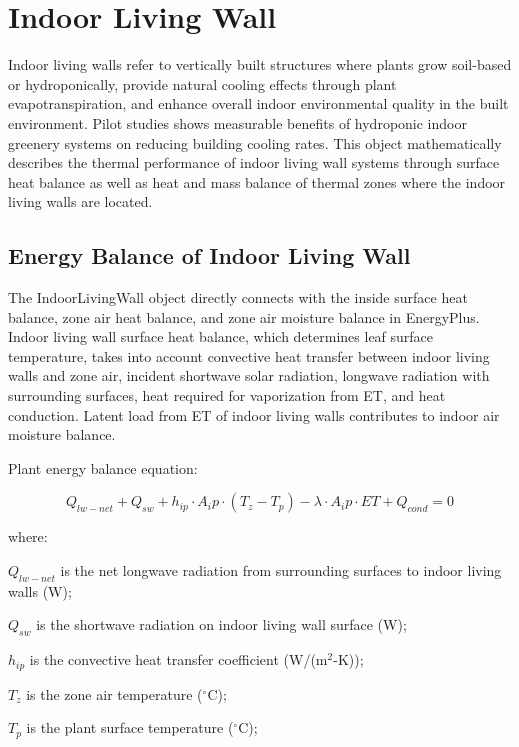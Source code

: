\section{Indoor Living Wall }\label{indoor-living-wall}

Indoor living walls refer to vertically built structures where plants grow soil-based or hydroponically, provide natural cooling effects through plant evapotranspiration, and enhance overall indoor environmental quality in the built environment. Pilot studies shows measurable benefits of hydroponic indoor greenery systems on reducing building cooling rates. This object mathematically describes the thermal performance of indoor living wall systems through surface heat balance as well as heat and mass balance of thermal zones where the indoor living walls are located. 

\subsection{Energy Balance of Indoor Living Wall}\label{energy-balance-of-indoor-living-wall}

The IndoorLivingWall object directly connects with the inside surface heat balance, zone air heat balance, and zone air moisture balance in EnergyPlus. Indoor living wall surface heat balance, which determines leaf surface temperature, takes into account convective heat transfer between indoor living walls and zone air, incident shortwave solar radiation, longwave radiation with surrounding surfaces, heat required for vaporization from ET, and heat conduction. Latent load from ET of indoor living walls contributes to indoor air moisture balance. 

Plant energy balance equation:

\begin{equation}
Q_{lw-net}+Q_{sw}+h_{ip} \cdot A_ip \cdot (T_z - T_p )-\lambda \cdot A_ip \cdot ET+Q_{cond}=0          
\end{equation}

where:

\(Q_{lw-net}\) is the net longwave radiation from surrounding surfaces to indoor living walls (W);

\(Q_{sw}\) is the shortwave radiation on indoor living wall surface (W);

\(h_{ip}\) is the convective heat transfer coefficient (W/(m\(^2\)-K));

\(T_z\) is the zone air temperature (\(^{\circ}\)C);

\(T_p\) is the plant surface temperature (\(^{\circ}\)C);

